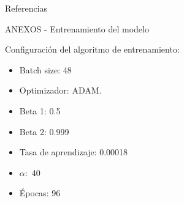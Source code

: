 \documentclass[12pt,aspectratio=169]{beamer}
\begin{document}
\nocite{*}
\begin{frame}[allowframebreaks]{Referencias}


\end{frame}

\begin{frame}{ANEXOS - Entrenamiento del modelo}

     Configuración del algoritmo de entrenamiento:
     \vspace{5mm}
     
     \begin{itemize}
        \item Batch size: 48
        \item Optimizador: ADAM.
        \item Beta 1: 0.5
        \item Beta 2: 0.999
        \item Tasa de aprendizaje: 0.00018
        \item $\alpha:$ 40
        \item Épocas: 96
    \end{itemize}
    
\end{frame}
\end{document}
